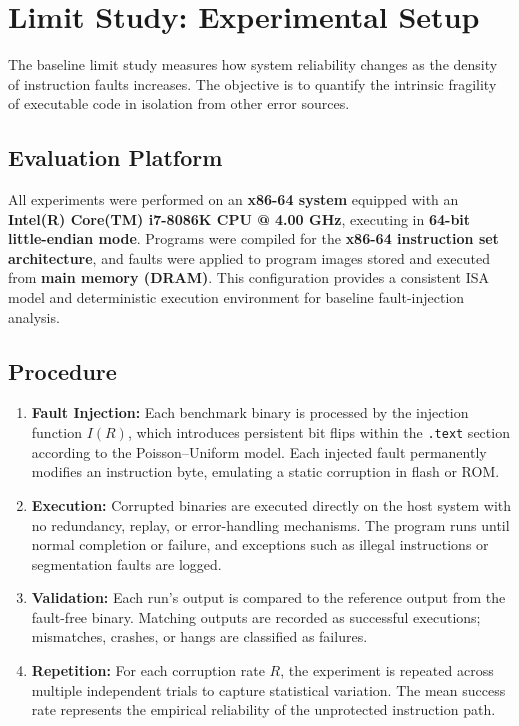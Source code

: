 \section{Limit Study: Experimental Setup}
\label{sec:limit-study-setup}

The baseline limit study measures how system reliability changes as the density of instruction faults increases.  
The objective is to quantify the intrinsic fragility of executable code in isolation from other error sources.

\subsection*{Evaluation Platform}
All experiments were performed on an \textbf{x86-64 system} equipped with an 
\textbf{Intel(R) Core(TM) i7-8086K CPU @ 4.00 GHz}, executing in 
\textbf{64-bit little-endian mode}. 
Programs were compiled for the \textbf{x86-64 instruction set architecture}, 
and faults were applied to program images stored and executed from \textbf{main memory (DRAM)}. 
This configuration provides a consistent ISA model and deterministic execution environment for 
baseline fault-injection analysis.

\subsection*{Procedure}

\begin{enumerate}
  \item \textbf{Fault Injection:} 
  Each benchmark binary is processed by the injection function $I(R)$, which introduces 
  persistent bit flips within the \texttt{.text} section according to the Poisson--Uniform model. 
  Each injected fault permanently modifies an instruction byte, emulating a static corruption 
  in flash or ROM.

  \item \textbf{Execution:} 
  Corrupted binaries are executed directly on the host system with no redundancy, replay, 
  or error-handling mechanisms. 
  The program runs until normal completion or failure, and exceptions such as illegal instructions 
  or segmentation faults are logged.

  \item \textbf{Validation:} 
  Each run’s output is compared to the reference output from the fault-free binary. 
  Matching outputs are recorded as successful executions; mismatches, crashes, or hangs 
  are classified as failures.

  \item \textbf{Repetition:} 
  For each corruption rate $R$, the experiment is repeated across multiple independent trials 
  to capture statistical variation. 
  The mean success rate represents the empirical reliability of the unprotected instruction path.
\end{enumerate}


